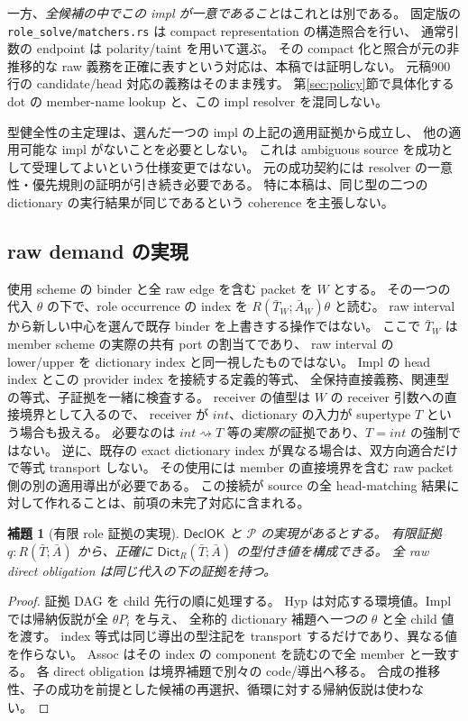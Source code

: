 \documentclass[11pt,a4paper]{article}
\newtheorem{lemma}[definition]{補題}
\newcommand{\Dict}{\mathsf{Dict}}
\newcommand{\Dir}{\mathrel{\rightsquigarrow}}
\begin{document}
一方、\emph{全候補の中でこの impl が一意であること}はこれとは別である。
固定版の \nolinkurl{role_solve/matchers.rs} は compact representation の構造照合を行い、
通常引数の endpoint は polarity/taint を用いて選ぶ。
その compact 化と照合が元の非推移的な raw 義務を正確に表すという対応は、本稿では証明しない。
元稿900行の candidate/head 対応の義務はそのまま残す。
第\ref{sec:policy}節で具体化する dot の member-name lookup と、この impl resolver を混同しない。

型健全性の主定理は、選んだ一つの impl の上記の適用証拠から成立し、
他の適用可能な impl がないことを必要としない。
これは ambiguous source を成功として受理してよいという仕様変更ではない。
元の成功契約には resolver の一意性・優先規則の証明が引き続き必要である。
特に本稿は、同じ型の二つの dictionary の実行結果が同じであるという coherence を主張しない。

\subsection{raw demand の実現}

使用 scheme の binder と全 raw edge を含む packet を \(W\) とする。
その一つの代入 \(\theta\) の下で、role occurrence の index を
\(R(\bar T_W;\bar A_W)\theta\) と読む。
raw interval から新しい中心を選んで既存 binder を上書きする操作ではない。
ここで \(\bar T_W\) は member scheme の実際の共有 port の割当てであり、
raw interval の lower/upper を dictionary index と同一視したものではない。
Impl の head index とこの provider index を接続する定義的等式、
全保持直接義務、関連型の等式、子証拠を一緒に検査する。
receiver の値型は \(W\) の receiver 引数への直接境界として入るので、
receiver が \(int\)、dictionary の入力が supertype \(T\) という場合も扱える。
必要なのは \(int\Dir T\) 等の\emph{実際の}証拠であり、\(T=int\) の強制ではない。
逆に、既存の exact dictionary index が異なる場合は、双方向適合だけで等式 transport しない。
その使用には member の直接境界を含む raw packet 側の別の適用導出が必要である。
この接続が source の全 head-matching 結果に対して作れることは、前項の未完了対応に含まれる。

\begin{lemma}[有限 role 証拠の実現]
\(\mathsf{DeclOK}\) と \(\mathcal P\) の実現があるとする。
有限証拠 \(q:R(\bar T;\bar A)\) から、正確に
\(\Dict_R(\bar T;\bar A)\) の型付き値を構成できる。
全 raw direct obligation は同じ代入の下の証拠を持つ。
\end{lemma}
\begin{proof}
証拠 DAG を child 先行の順に処理する。
Hyp は対応する環境値。Impl では帰納仮説が全 \(\theta P_i\) を与え、
全称的 dictionary 補題へ\emph{一つの} \(\theta\) と全 child 値を渡す。
index 等式は同じ導出の型注記を transport するだけであり、異なる値を作らない。
Assoc はその index の component を読むので全 member と一致する。
各 direct obligation は境界補題で別々の code/導出へ移る。
合成の推移性、子の成功を前提とした候補の再選択、循環に対する帰納仮説は使わない。
\end{proof}
\end{document}
